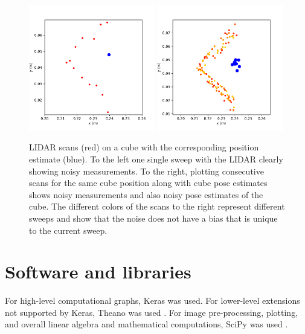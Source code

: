 \begin{figure}[h]
    \centering
    \includegraphics[width=0.49\textwidth]{res/cube_pose_lidar_one_scan.pdf}
    \includegraphics[width=0.49\textwidth]{res/cube_pose_lidar_variance.pdf}

    \caption{LIDAR scans (red) on a cube with the corresponding position
    estimate (blue). To the left one single sweep with the LIDAR clearly
    showing noisy measurements. To the right, plotting consecutive scans for
    the same cube position along with cube pose estimates shows noisy
    measurements and also noisy pose estimates of the cube. The different
    colors of the scans to the right represent different sweeps and show that
    the noise does not have a bias that is unique to the current sweep.}

    \label{fig:lidar_noise}
\end{figure}

\section{Software and libraries}

For high-level computational graphs, Keras \cite{chollet2015keras} was used.
For lower-level extensions not supported by Keras, Theano was used
\cite{theano2016theano}. For image pre-processing, plotting, and overall linear
algebra and mathematical computations, SciPy was used \cite{scipy2016scipy}.
